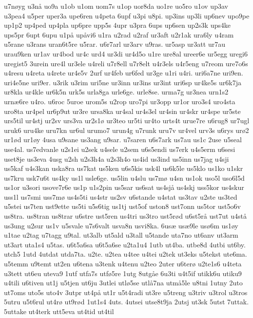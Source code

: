{u7n^^f8yg
u3n^^e5
uo9a
u1ob
u1om
uom7s
u1op
uor8da
uo1re
uo5ro
u1ov
up3av
u3pea4
u5per
uper3a
upe6ren
u4peta
6upf
u3pi
u8pi.
up3ins
up3li
up6nev
upo9pe
up1p2
up4ped
up4pla
up6pre
upp5s
4upr
u3pra
6ups
up6sen
up2s3k
ups4ke
ups5pr
6upt
6upu
u1p^^e5
up^^e5vi6
u1ra
u2rad
u2raf
ur3aft
u2r1ak
ura6ly
u4ram
u5rane
u3rans
uran6t5re
u5rar.
u6r7arl
ur3arv
u9ras.
ur5asp
ur3att
ur7au
urau9ken
ur1av
ur4bod
ur4c
urd4
ur3di
ur4d5o
u1re
ure8al
ureer6e
ur5egg
uregi6
uregist5
3urein
ure4l
ur3ele
u4reli
u7r8ell
u7r8elt
u4r3els
u4r5eng
u7reom
ure7o6s
u4resu
u4reta
u4rete
ur4e5v
2urf
ur4feb
ur6fed
ur3ge
u1ri
u4ri.
uri6a7ne
uri9en.
uri4e5ne
uri9er.
u3rik
u3rim
uri5ne
ur3inn
ur3ins
ur3int
uri6sp
ur4ke5s
ur6k7ja
ur8kla
ur4kle
ur6k5n
urk5s
urla8ga
urle6ge.
urle8se.
urma7g
ur3nea
urn1s2
urn^^e66re
u4ro.
u6roc
5uroe
urom5s
u2rop
uro7pi
ur3opp
ur1or
uro3s4
uro4sta
uro8ta
ur4pel
ur6p9ut
ur3re
ursa8ka
ur4sal
ur4s3el
ur4sin
ur4skr
ur4spe
ur5ste
urs5til
ur4stj
ur2sv
urs3va
ur2s1^^f8
ur3teo
ur5ti
ur4to
urts4t
urue7re
u6rug8
ur7ugl
uruk6
uru4ke
uru7kn
ur6ul
urumo7
urun4g
u7runk
uru7v
ur4vel
urv3s
u6rys
ur^^f82
ur1^^f8d
ur1^^f8y
4usa
u9sane
us3ang
u9sar.
u7saren
u6s7ark
us7au
us1c
2use
u5seal
use4al.
us7edvanle
u2s1ei
u2sek
u4sele
u2sem
u6s5endi
us7erk
u4s5erm
u6sesi
uset8je
us3eva
4usg
u2sh
u2s3h4a
u2s3h4o
us4id
us3ind
us5inn
us7jag
u4sji
us5kaf
u4s3kan
uska8ra
us7kat
us5ken
u6s5kis
usk4l
us6k5le
us5klo
us1ko
u1skr
us7kru
usk7u6t
us4ky
us1l
usle6ge.
us5lin
u4slu
us7m^^f8
u4sn
us1ok
uso5l
uso6l5d
us1or
u3sori
usove7r6e
us1p
u1s2pin
us5sar
us6sat
us4sj^^e5
us4skj
uss5kor
us4skur
uss1l
us7smi
uss7m^^f8
us4s5ti
us4str
us2sv
u6stande
u4stat
us3tav
u2ste
us3ted
u5stei
us7ten
ust9ette
us5ti
u5s6tig
us1tj
ust5of
uston8
ust7onn
us5tor
ust5o6v
us8tra.
us8tran
us8trar
u6stre
ust5ren
us4tri
us3tro
ust5r^^f8d
u6st5r^^e5
ust7ut
u4st^^e5
us3ung
u2sur
us1v
u5svale
u7s6valt
usva8n
usvi8ka.
6us^^e6
us^^e69le
us^^f86m
us1^^f8y
u1tae
u2tag
u7tagg
u9tal.
ut3alb
ut5ald
u3tall
u5tande
uta7no
ut6anv
ut3arm
ut3art
uta1s4
u5tas.
u6t5a6sa
u6t5a6se
u2ta1u4
1utb
ut4ba.
utbe8d
4utbi
ut6by.
utch5
1utd
4utdat
utda7ta.
u2te.
u2tea
u4tee
u4tei
u2tek
ut3eks
u5tekst
ute6ma.
u5temm
u9temt
ut2en
u6tena
u3tenk
u4tenu
u2teo
2uter
u6ter^^f8
u2te1s6
u4teta
u3tett
ut6eu
uteva9
1utf
utfa7s
utf^^f85re
1utg
8utg^^e5e
6u3ti
u4t5if
utikk6u
utiku9
u4tili
u6tiven
ut1j
u5tjen
ut6ju
3utlei
utl^^f85se
utl^^e57na
utm^^e55le
u8tni
1utny
2uto
ut7oms
uto5s
uto4v
3utpr
ut4p^^e5
ut1r
u5t4radi
ut3re
u5treng
u3triv
u3trol
u3tros
5utru
u5t6rul
ut4r^^f8
ut9r^^f8d
1ut1s4
4uts.
4utsei
utse8t9ja
2utsj
ut3sk
5utst
7uttak.
5uttake
ut4terk
utt5eva
ut4tid
ut4til
}
